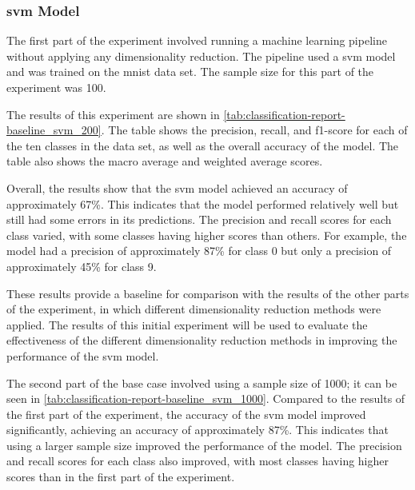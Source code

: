 \subsubsection{\gls{svm} Model}\label{subsubsec:experiment_4_no_dimmensionality_reduction}





The first part of the experiment involved running a machine learning pipeline without applying any dimensionality reduction. The pipeline used a \gls{svm} model and was trained on the \gls{mnist} data set. The sample size for this part of the experiment was 100.

The results of this experiment are shown in \ref{tab:classification-report-baseline_svm_200}. The table shows the precision, recall, and f1-score for each of the ten classes in the data set, as well as the overall accuracy of the model. The table also shows the macro average and weighted average scores.

Overall, the results show that the \gls{svm} model achieved an accuracy of approximately 67\%. This indicates that the model performed relatively well but still had some errors in its predictions. The precision and recall scores for each class varied, with some classes having higher scores than others. For example, the model had a precision of approximately 87\% for class 0 but only a precision of approximately 45\% for class 9. 

These results provide a baseline for comparison with the results of the other parts of the experiment, in which different dimensionality reduction methods were applied. The results of this initial experiment will be used to evaluate the effectiveness of the different dimensionality reduction methods in improving the performance of the \gls{svm} model.

The second part of the base case involved using a sample size of 1000; it can be seen in \ref{tab:classification-report-baseline_svm_1000}. Compared to the results of the first part of the experiment, the accuracy of the \gls{svm} model improved significantly, achieving an accuracy of approximately 87\%. This indicates that using a larger sample size improved the performance of the model. The precision and recall scores for each class also improved, with most classes having higher scores than in the first part of the experiment.

